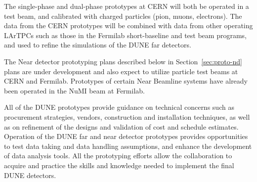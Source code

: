 The single-phase and dual-phase prototypes at CERN will both be operated in a test beam, and calibrated with charged particles (pion, muons, electrons). The data from the CERN
prototypes will be combined with data from other operating LArTPCs such as those in the Fermilab short-baseline and test beam programs, and used to refine the simulations of the DUNE far detectors.  

The Near detector prototyping plans described below in Section~\ref{sec:proto-nd} plans are under development and also expect to utilize particle test beams at CERN and Fermilab.  Prototypes of certain Near Beamline systems have already been operated in the NuMI beam at Fermilab.

All of the DUNE prototypes provide guidance on technical concerns such as procurement strategies, vendors, construction and installation techniques, as well as on refinement of the designs and validation of cost and schedule estimates.  Operation of the DUNE far and near detector prototypes provides opportunities to test data taking and data handling assumptions, and enhance the development of data analysis tools.  All the prototyping efforts allow the collaboration to acquire and practice the skills and knowledge needed to implement the final DUNE detectors.


